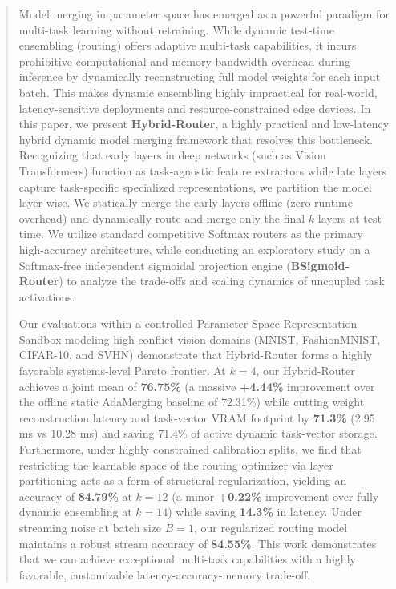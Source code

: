 \begin{abstract}
Model merging in parameter space has emerged as a powerful paradigm for multi-task learning without retraining. While dynamic test-time ensembling (routing) offers adaptive multi-task capabilities, it incurs prohibitive computational and memory-bandwidth overhead during inference by dynamically reconstructing full model weights for each input batch. This makes dynamic ensembling highly impractical for real-world, latency-sensitive deployments and resource-constrained edge devices. In this paper, we present \textbf{Hybrid-Router}, a highly practical and low-latency hybrid dynamic model merging framework that resolves this bottleneck. Recognizing that early layers in deep networks (such as Vision Transformers) function as task-agnostic feature extractors while late layers capture task-specific specialized representations, we partition the model layer-wise. We statically merge the early layers offline (zero runtime overhead) and dynamically route and merge only the final $k$ layers at test-time. We utilize standard competitive Softmax routers as the primary high-accuracy architecture, while conducting an exploratory study on a Softmax-free independent sigmoidal projection engine (\textbf{BSigmoid-Router}) to analyze the trade-offs and scaling dynamics of uncoupled task activations.

Our evaluations within a controlled Parameter-Space Representation Sandbox modeling high-conflict vision domains (MNIST, FashionMNIST, CIFAR-10, and SVHN) demonstrate that Hybrid-Router forms a highly favorable systems-level Pareto frontier. At $k=4$, our Hybrid-Router achieves a joint mean of \textbf{76.75\%} (a massive \textbf{+4.44\%} improvement over the offline static AdaMerging baseline of 72.31\%) while cutting weight reconstruction latency and task-vector VRAM footprint by \textbf{71.3\%} (2.95 ms vs 10.28 ms) and saving 71.4\% of active dynamic task-vector storage. Furthermore, under highly constrained calibration splits, we find that restricting the learnable space of the routing optimizer via layer partitioning acts as a form of structural regularization, yielding an accuracy of \textbf{84.79\%} at $k=12$ (a minor \textbf{+0.22\%} improvement over fully dynamic ensembling at $k=14$) while saving \textbf{14.3\%} in latency. Under streaming noise at batch size $B=1$, our regularized routing model maintains a robust stream accuracy of \textbf{84.55\%}. This work demonstrates that we can achieve exceptional multi-task capabilities with a highly favorable, customizable latency-accuracy-memory trade-off.
\end{abstract}
